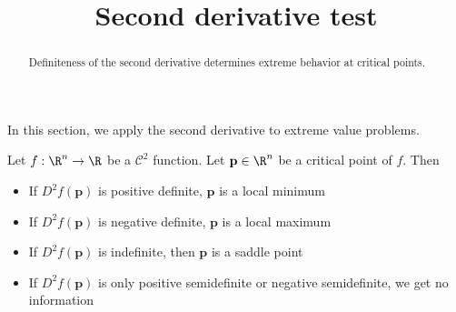 \documentclass{ximera}
\title{Second derivative test}
\begin{document}
	\begin{abstract}
		Definiteness of the second derivative determines extreme behavior at critical points.
	\end{abstract}
	
	In this section, we apply the second derivative to extreme value problems.
	
	\begin{theorem}
		Let $f:\R^n \to \R$ be a $\mathcal{C}^2$ function.  Let $\mathbf{p} \in \R^n$ be a critical point of $f$.  Then 
			\begin{itemize}
				\item If $D^2f(\mathbf{p})$ is positive definite, $\mathbf{p}$ is a local minimum
				\item If $D^2f(\mathbf{p})$ is negative definite, $\mathbf{p}$ is a local maximum
				\item If $D^2f(\mathbf{p})$ is indefinite, then $\mathbf{p}$ is a saddle point
				\item If $D^2f(\mathbf{p})$ is only positive semidefinite or negative semidefinite, we get no information
			\end{itemize}
	\end{theorem}
	
\end{document}
